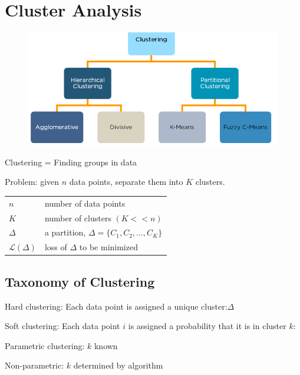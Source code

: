 \section{Cluster Analysis}

\begin{figure}[!h]
    \includegraphics[width = \columnwidth]{figures/11/ClusteringOverview.png}   
\end{figure}
Clustering = Finding groups in data

Problem: given \(n\) data points, separate them into \(K\) clusters.
\begin{table}[!h]
    \begin{tabular}{ll}
    \(n\) &  number of data points\\
    \(K\) &  number of clusters \((K << n)\)\\
    \(\Delta\) &  a partition, \(\Delta = \{C_1,C_2,\dots,C_K\}\)\\
    \(\mathcal{L}(\Delta)\) & loss of \(\Delta\) to be minimized
    \end{tabular}
\end{table}

\subsection{Taxonomy of Clustering}
Hard clustering: Each data point is assigned a unique cluster:\(\Delta\)

Soft clustering: Each data point \(i\) is assigned a probability that it is in cluster \(k\):

Parametric clustering: \(k\) known

Non-parametric: \(k\) determined by algorithm
